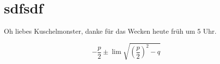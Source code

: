 \documentclass[12pt,ngerman]{scrartcl}
\begin{document}
\section{sdfsdf}

Oh liebes Kuschelmonster, danke für das Wecken heute früh um 5 Uhr.

\[
- \frac{p}{2} \pm \lim \sqrt{ \left( \frac{p}{2}\right)^2 -q  }
\]
\end{document}
